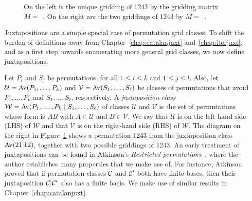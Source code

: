 \documentclass[12pt, a4paper, twoside]{report}
\begin{document}
\begin{figure}[!ht]
\begin{center}
\captionsetup{singlelinecheck=off}
\caption{\small On the left is the unique gridding of 1243 by the gridding matrix $M =$~\usebox{\smlmata}. On the right are the two griddings of 1243 by $M =$~\usebox{\smlmatb}.}
\label{fig:gridexample}
\end{center}
\end{figure}

Juxtapositions are a simple special case of permutation grid classes. To shift the burden of definitions away from Chapter~\ref{chap:catalanjuxt} and~\ref{chap:iterjuxt}, and as a first step towards enumerating more general grid classes, we now define juxtapositions.

Let $P_i$ and $S_j$ be permutations, for all $1\leq i\leq k$ and $1 \leq j \leq l$. Also, let $\mathcal{U} = \mathrm{Av}(P_1,\ldots,P_k)$ and $\mathcal{V} = \mathrm{Av}(S_1,\ldots,S_\ell)$ be  classes of permutations that avoid $P_1,\ldots, P_k$ and $S_1,\ldots,S_\ell$, respectively. A \emph{juxtaposition class} $\mathcal{W} = \mathrm{Av}(P_1,\ldots,P_k\mid S_1, \ldots, S_\ell)$ of classes $\mathcal{U}$ and $\mathcal{V}$ is the set of permutations whose form is $AB$ with $A\in \mathcal{U}$ and $B \in \mathcal{V}$. We say that $\mathcal{U}$ is on the left-hand side (LHS) of $\mathcal{W}$ and that $\mathcal{V}$ is on the right-hand side (RHS) of $\mathcal{W}$. The diagram on the right in Figure~\ref{fig:gridexample} shows a permutation 1243 from the juxtaposition class $\mathrm{Av}(21|12)$, together with two possible griddings of 1243. An early treatment of juxtapositions can be found in Atkinson's \emph{Restricted permutations}~\cite{atkinson1997restricted}, where the author establishes many properties that we make use of. For instance, Atkinson proved that if permutation classes $\mathcal{C}$ and $\mathcal{C}'$ both have finite bases, then their juxtaposition $\mathcal{C}|\mathcal{C}'$ also has a finite basis. We make use of similar results in Chapter~\ref{chap:catalanjuxt}.
\end{document}
